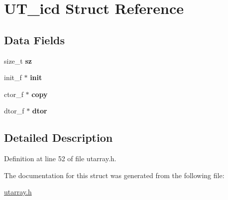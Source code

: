 \hypertarget{struct_u_t__icd}{
\section{UT\_\-icd Struct Reference}
\label{struct_u_t__icd}
}
\subsection*{Data Fields}
\begin{DoxyCompactItemize}
\item 
\hypertarget{struct_u_t__icd_a7021fa86e4197995817c9682140c2c82}{
size\_\-t {\bfseries sz}}
\label{struct_u_t__icd_a7021fa86e4197995817c9682140c2c82}

\item 
\hypertarget{struct_u_t__icd_a4efb7d75484d26a649038a991329cfd1}{
init\_\-f $\ast$ {\bfseries init}}
\label{struct_u_t__icd_a4efb7d75484d26a649038a991329cfd1}

\item 
\hypertarget{struct_u_t__icd_af58b65eb0c3c21a99dc31c61f996408b}{
ctor\_\-f $\ast$ {\bfseries copy}}
\label{struct_u_t__icd_af58b65eb0c3c21a99dc31c61f996408b}

\item 
\hypertarget{struct_u_t__icd_ab1e1f6d1a48da57ff8e42b267dccedab}{
dtor\_\-f $\ast$ {\bfseries dtor}}
\label{struct_u_t__icd_ab1e1f6d1a48da57ff8e42b267dccedab}

\end{DoxyCompactItemize}


\subsection{Detailed Description}


Definition at line 52 of file utarray.h.



The documentation for this struct was generated from the following file:\begin{DoxyCompactItemize}
\item 
\hyperlink{utarray_8h}{utarray.h}\end{DoxyCompactItemize}
